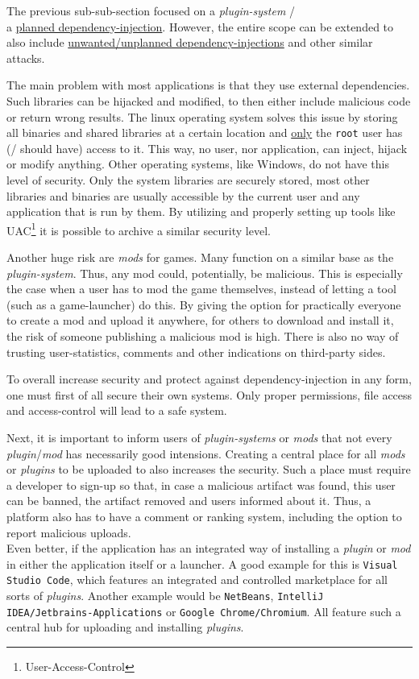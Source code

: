 \clearpage
{}
The previous sub-sub-section focused on a \textit{plugin-system} /\\ a \underline{planned dependency-injection}.
However, the entire scope can be extended to also include \underline{unwanted/unplanned dependency-injections} and other similar attacks.

The main problem with most applications is that they use external dependencies.
Such libraries can be hijacked and modified, to then either include malicious code or return wrong results.
The linux operating system solves this issue by storing all binaries and shared libraries at a certain location and \underline{only} the \texttt{root} user has (/ should have) access to it.
This way, no user, nor application, can inject, hijack or modify anything.
Other operating systems, like Windows, do not have this level of security.
Only the system libraries are securely stored, most other libraries and binaries are usually accessible by the current user and any application that is run by them.
By utilizing and properly setting up tools like UAC\footnote{User-Access-Control} it is possible to archive a similar security level.

Another huge risk are \textit{mods} for games.
Many function on a similar base as the \textit{plugin-system}.
Thus, any mod could, potentially, be malicious.
This is especially the case when a user has to mod the game themselves, instead of letting a tool (such as a game-launcher) do this.
By giving the option for practically everyone to create a mod and upload it anywhere, for others to download and install it, the risk of someone publishing a malicious mod is high.
There is also no way of trusting user-statistics, comments and other indications on third-party sides.

To overall increase security and protect against dependency-injection in any form, one must first of all secure their own systems.
Only proper permissions, file access and access-control will lead to a safe system.

Next, it is important to inform users of \textit{plugin-systems} or \textit{mods} that not every \textit{plugin}/\textit{mod} has necessarily good intensions.
Creating a central place for all \textit{mods} or \textit{plugins} to be uploaded to also increases the security.
Such a place must require a developer to sign-up so that, in case a malicious artifact was found, this user can be banned, the artifact removed and users informed about it.
Thus, a platform also has to have a comment or ranking system, including the option to report malicious uploads.\\
Even better, if the application has an integrated way of installing a \textit{plugin} or \textit{mod} in either the application itself or a launcher.
A good example for this is \texttt{Visual Studio Code}, which features an integrated and controlled marketplace for all sorts of \textit{plugins}.
Another example would be \texttt{NetBeans}, \texttt{IntelliJ IDEA/Jetbrains-Applications} or \texttt{Google Chrome/Chromium}.
All feature such a central hub for uploading and installing \textit{plugins}.

